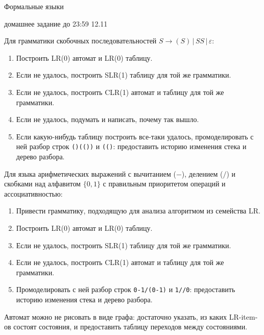 \documentclass[12pt]{article}
\begin{document}
\begin{center} 
{\LARGE Формальные языки}

{\Large домашнее задание до 23:59 12.11}
\end{center}

\enumerate
{
   \item Для грамматики скобочных последовательностей $ S \rightarrow  ( S ) \, | \, S S  \, | \, \varepsilon$:
    
    \begin{enumerate}
        \item Построить LR(0) автомат и LR(0) таблицу.
        \item Если не удалось, построить SLR(1) таблицу для той же грамматики.
        \item Если не удалось, построить CLR(1) автомат и таблицу для той же грамматики.
        \item Если не удалось, подумать и написать, почему так вышло. 
        \item Если какую-нибудь таблицу построить все-таки удалось, промоделировать с ней разбор строк \verb!()(())! и \verb!(()!: предоставить историю изменения стека и дерево разбора.
    \end{enumerate} 
    \item Для языка арифметических выражений с вычитанием ($-$), делением ($/$) и скобками над алфавитом $\{0, 1\}$ с правильным приоритетом операций и ассоциативностью:
    \begin{enumerate}
        \item Привести грамматику, подходящую для анализа алгоритмом из семейства LR.
        \item Построить LR(0) автомат и LR(0) таблицу.
        \item Если не удалось, построить SLR(1) таблицу для той же грамматики.
        \item Если не удалось, построить CLR(1) автомат и таблицу для той же грамматики.
        \item Промоделировать с ней разбор строк \verb!0-1/(0-1)! и \verb!1//0!: предоставить историю изменения стека и дерево разбора.
    \end{enumerate} 
}

  Автомат можно не рисовать в виде графа: достаточно указать, из каких LR-item-ов состоят состояния, и предоставить таблицу переходов между состояниями. 
\end{document}

